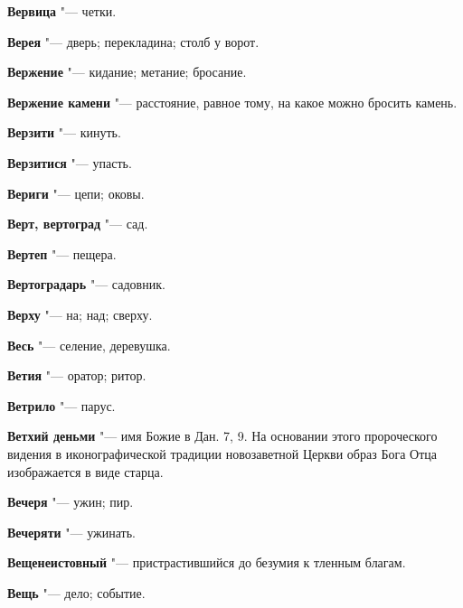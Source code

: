 \begin{mymulticols}{2}
\noindent\textbf{Вервица} "--- четки. 




\noindent\textbf{Верея} "--- дверь; перекладина; столб у ворот. 




\noindent\textbf{Вержение} "--- кидание; метание; бросание. 




\noindent\textbf{Вержение камени} "--- расстояние, равное тому, на какое можно бросить камень. 




\noindent\textbf{Верзити} "--- кинуть. 




\noindent\textbf{Верзитися} "--- упасть. 




\noindent\textbf{Вериги} "--- цепи; оковы. 




\noindent\textbf{Верт, вертоград} "--- сад. 




\noindent\textbf{Вертеп} "--- пещера. 




\noindent\textbf{Вертоградарь} "--- садовник. 




\noindent\textbf{Верху} "--- на; над; сверху. 




\noindent\textbf{Весь} "--- селение, деревушка. 




\noindent\textbf{Ветия} "--- оратор; ритор. 




\noindent\textbf{Ветрило} "--- парус. 




\noindent\textbf{Ветхий деньми} "--- имя Божие в Дан. 7, 9. На основании этого пророческого видения в иконографической традиции новозаветной Церкви образ Бога Отца изображается в виде старца. 




\noindent\textbf{Вечеря} "--- ужин; пир. 




\noindent\textbf{Вечеряти} "--- ужинать. 




\noindent\textbf{Вещенеистовный} "--- пристрастившийся до безумия к тленным благам. 




\noindent\textbf{Вещь} "--- дело; событие. 





\end{mymulticols}
